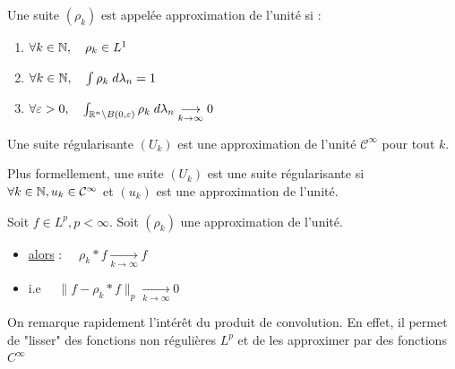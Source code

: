 \begin{definition}
    Une suite $(\rho_k)$ est appelée approximation de l'unité si :
    \begin{enumerate}
        \item $ \forall k \in \mathbb{N}, \quad \rho_k \in {L}^1$ 
        \item $ \forall k \in \mathbb{N}, \quad \int \rho_k \; d \lambda_n = 1 $
        \item $ \forall \varepsilon > 0, \quad \int_{\mathbb{R}^n \backslash B(0,\varepsilon)} \rho_k \; d \lambda_n \underset{k \to \infty}{\longrightarrow} 0 $
    \end{enumerate}
\end{definition}

\begin{definition}
    Une suite régularisante $(U_k)$ est une approximation de l'unité $\mathcal{C}^\infty$ pour tout $k$. 
    \vspace{0.5cm}

    Plus formellement, une suite $(U_k)$ est une suite régularisante si $ \forall k \in \mathbb{N}, u_k \in \mathcal{C}^\infty$ 
    et $(u_k)$ est une approximation de l'unité. 
\end{definition}

\begin{theorem}
    Soit $f \in {L}^p, p < \infty$. Soit $(\rho_k)$ une approximation de l'unité. 
    \begin{itemize}
        \item[]\underline{alors} : $ \quad \rho_k \ast f \underset{k \to \infty}{\longrightarrow} f$ 
        \item[]i.e $ \quad  \|  f - \rho_k \ast f \|_p \underset{k \to \infty}{\longrightarrow} 0$ 
    \end{itemize}
\end{theorem}

\begin{remark}
    On remarque rapidement l'intérêt du produit de convolution. 
    En effet, il permet de "lisser" des fonctions non régulières $L^p$ et de les approximer 
    par des fonctions $C^\infty$ 
\end{remark}